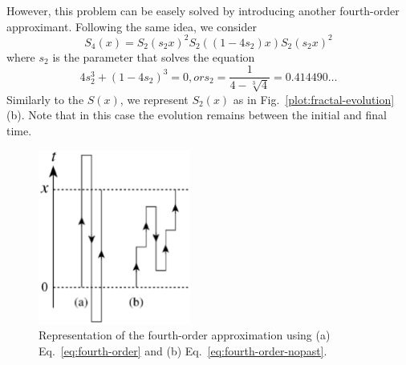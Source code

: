 However, this problem can be easely solved by introducing another fourth-order approximant. Following the same idea, we consider
\begin{equation} \label{eq:fourth-order-nopast}
S_4(x) = S_2(s_2x)^2 S_2((1-4s_2)x) S_2(s_2x)^2	
\end{equation}
where $s_2$ is the parameter that solves the equation
\begin{equation}
4s_2^3 + (1-4s_2)^3 = 0, or s_2 = \frac{1}{4 - \sqrt[3]{4}}=0.414490\ldots
\end{equation}
Similarly to the $S(x)$, we represent $S_2(x)$ as in Fig.~\ref{plot:fractal-evolution}(b). Note that in this case the evolution remains between the initial and final time.
\begin{figure}
   \centering
   \includegraphics[width=5cm]{Plots/evolution.eps}
   \caption{Representation of the fourth-order approximation using (a) Eq.~\eqref{eq:fourth-order} and (b) Eq.~\eqref{eq:fourth-order-nopast}.} \label{plot:evolution}
\end{figure}


